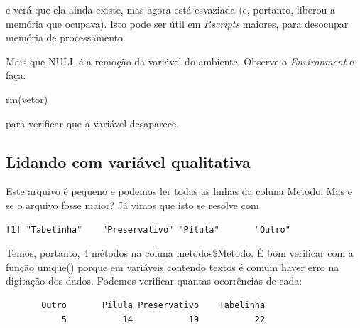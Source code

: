 \documentclass[
]{article}
\newenvironment{Shaded}{\begin{snugshade}}{\end{snugshade}}
\newcommand{\FunctionTok}[1]{\textcolor[rgb]{0.00,0.00,0.00}{#1}}
\newcommand{\NormalTok}[1]{#1}
\newcommand{\SpecialCharTok}[1]{\textcolor[rgb]{0.00,0.00,0.00}{#1}}
\begin{document}
e verá que ela ainda existe, mas agora está esvaziada (e, portanto,
liberou a memória que ocupava). Isto pode ser útil em \emph{Rscripts}
maiores, para desocupar memória de processamento.

Mais que NULL é a remoção da variável do ambiente. Observe o
\emph{Environment} e faça:

\begin{Shaded}
\begin{Highlighting}[]
\FunctionTok{rm}\NormalTok{(vetor)}
\end{Highlighting}
\end{Shaded}

para verificar que a variável desaparece.

\hypertarget{lidando-com-variuxe1vel-qualitativa}{%
\subsection{Lidando com variável
qualitativa}\label{lidando-com-variuxe1vel-qualitativa}}

Este arquivo é pequeno e podemos ler todas as linhas da coluna Metodo.
Mas e se o arquivo fosse maior? Já vimos que isto se resolve com

\begin{Shaded}
\end{Shaded}

\begin{verbatim}
[1] "Tabelinha"    "Preservativo" "Pílula"       "Outro"       
\end{verbatim}

Temos, portanto, 4 métodos na coluna metodos\$Metodo. É bom verificar
com a função unique() porque em variáveis contendo textos é comum haver
erro na digitação dos dados. Podemos verificar quantas ocorrências de
cada:

\begin{Shaded}
\end{Shaded}

\begin{verbatim}
       Outro       Pílula Preservativo    Tabelinha 
           5           14           19           22 
\end{verbatim}
\end{document}
